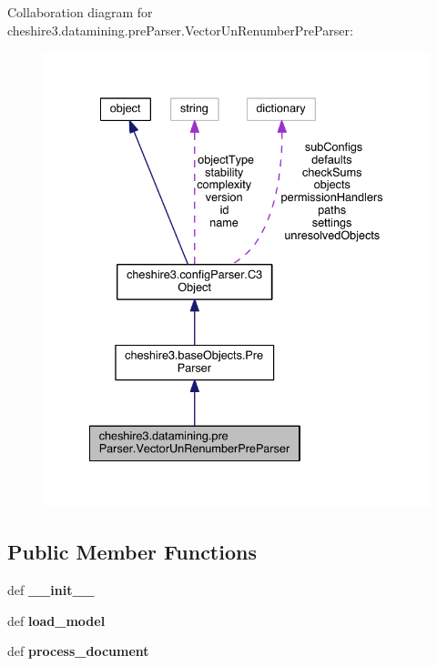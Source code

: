 Collaboration diagram for cheshire3.\-datamining.\-pre\-Parser.\-Vector\-Un\-Renumber\-Pre\-Parser\-:
\nopagebreak
\begin{figure}[H]
\begin{center}
\leavevmode
\includegraphics[width=335pt]{classcheshire3_1_1datamining_1_1pre_parser_1_1_vector_un_renumber_pre_parser__coll__graph}
\end{center}
\end{figure}
\subsection*{Public Member Functions}
\begin{DoxyCompactItemize}
\item 
\hypertarget{classcheshire3_1_1datamining_1_1pre_parser_1_1_vector_un_renumber_pre_parser_a18cb41d2ac4aff50ac106a56c58ce557}{def {\bfseries \-\_\-\-\_\-init\-\_\-\-\_\-}}\label{classcheshire3_1_1datamining_1_1pre_parser_1_1_vector_un_renumber_pre_parser_a18cb41d2ac4aff50ac106a56c58ce557}

\item 
\hypertarget{classcheshire3_1_1datamining_1_1pre_parser_1_1_vector_un_renumber_pre_parser_a66524a7ac643039c0d65e6e87d42b5aa}{def {\bfseries load\-\_\-model}}\label{classcheshire3_1_1datamining_1_1pre_parser_1_1_vector_un_renumber_pre_parser_a66524a7ac643039c0d65e6e87d42b5aa}

\item 
\hypertarget{classcheshire3_1_1datamining_1_1pre_parser_1_1_vector_un_renumber_pre_parser_a49185cf3816f9b45121dfb4d57ccd8b4}{def {\bfseries process\-\_\-document}}\label{classcheshire3_1_1datamining_1_1pre_parser_1_1_vector_un_renumber_pre_parser_a49185cf3816f9b45121dfb4d57ccd8b4}

\end{DoxyCompactItemize}
